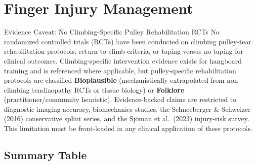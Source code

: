 \section{Finger Injury Management}
\label{sec:injury}

\begin{warningbox}{Evidence Caveat: No Climbing-Specific Pulley Rehabilitation RCTs}
No randomized controlled trials (RCTs) have been conducted on climbing pulley-tear rehabilitation protocols, return-to-climb criteria, or taping versus no-taping for clinical outcomes. Climbing-specific intervention evidence exists for hangboard training and is referenced where applicable, but pulley-specific rehabilitation protocols are classified \textbf{Bioplausible} (mechanistically extrapolated from non-climbing tendinopathy RCTs or tissue biology) or \textbf{Folklore} (practitioner/community heuristic). Evidence-backed claims are restricted to diagnostic imaging accuracy, biomechanics studies, the Schneeberger \& Schweizer (2016) conservative splint series, and the Sjöman et al.\ (2023) injury-risk survey. This limitation must be front-loaded in any clinical application of these protocols.
\end{warningbox}

\subsection*{Summary Table}

